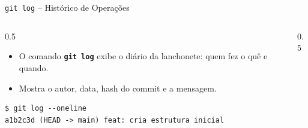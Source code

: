 \documentclass[aspectratio=169]{beamer}
\begin{document}
\begin{frame}[fragile]{\texttt{git log} -- Histórico de Operações}
    \begin{columns}
        \begin{column}{0.5\textwidth}
            \begin{itemize}
                \item O comando \textbf{\texttt{git log}} exibe o diário da lanchonete: quem fez o quê e quando.
                \item Mostra o autor, data, hash do commit e a mensagem.
            \end{itemize}
\begin{lstlisting}[basicstyle=\ttfamily\tiny]
$ git log --oneline
a1b2c3d (HEAD -> main) feat: cria estrutura inicial
\end{lstlisting}
        \end{column}
        \begin{column}{0.5\textwidth}
            \begin{center}
            \end{center}
        \end{column}
    \end{columns}
\end{frame}
\end{document}
